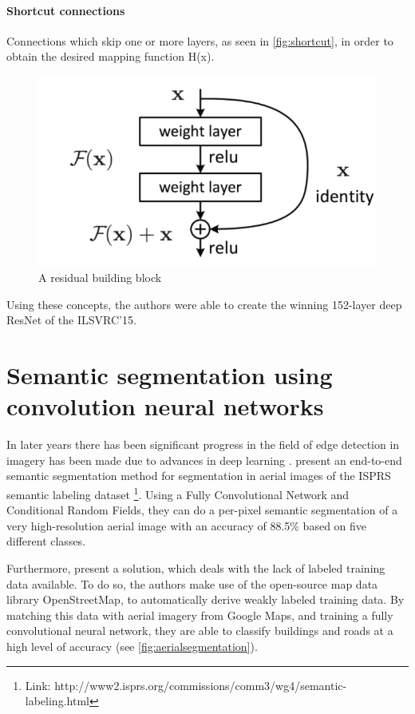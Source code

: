 \paragraph{Shortcut connections}
Connections which skip one or more layers, as seen in \autoref{fig:shortcut}, in order to obtain the desired mapping function H(x).

\begin{figure}[!h]
	\centering
	\includegraphics[scale=0.5]{fig/shortcut_connection.png}
	\caption{A residual building block \citep{Wu2017}}
	\label{fig:shortcut}
\end{figure}

Using these concepts, the authors were able to create the winning 152-layer deep ResNet of the ILSVRC'15.

\section{Semantic segmentation using convolution neural networks}
In later years there has been significant progress in the field of edge detection in imagery has been made due to advances in deep learning \citep{Yu2017}. \cite{Marmanis2016} present an end-to-end semantic segmentation method for segmentation in aerial images of the ISPRS semantic labeling dataset \footnote{Link: http://www2.isprs.org/commissions/comm3/wg4/semantic-labeling.html}. Using a Fully Convolutional Network and Conditional Random Fields, they can do a per-pixel semantic segmentation of a very high-resolution aerial image with an accuracy of 88.5\% based on five different classes.

Furthermore, \cite{Kaiser2017} present a solution, which deals with the lack of labeled training data available. To do so, the authors make use of the open-source map data library OpenStreetMap, to automatically derive weakly labeled training data. By matching this data with aerial imagery from Google Maps, and training a fully convolutional neural network, they are able to classify buildings and roads at a high level of accuracy (see \autoref{fig:aerialsegmentation}).

